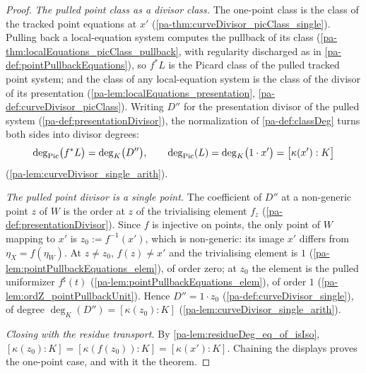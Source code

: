 \begin{proof}
  \emph{The pulled point class as a divisor class.} The one-point class is the class
  of the tracked point equations at \(x'\)
  (\ref{pa-thm:curveDivisor_picClass_single}). Pulling back a local-equation system
  computes the pullback of its class (\ref{pa-thm:localEquations_picClass_pullback}, with
  regularity discharged as in \ref{pa-def:pointPullbackEquations}), so \(f^{*}L\) is the
  Picard class of the pulled tracked point system; and the class of any local-equation
  system is the class of the divisor of its presentation
  (\ref{pa-lem:localEquations_presentation}, \ref{pa-def:curveDivisor_picClass}). Writing
  \(D''\) for the presentation divisor of the pulled system
  (\ref{pa-def:presentationDivisor}), the normalization of \ref{pa-def:classDeg} turns both
  sides into divisor degrees:
  \[
    \deg_{\operatorname{Pic}}\bigl(f^{*}L\bigr) = \deg_{K}\bigl(D''\bigr), \qquad
    \deg_{\operatorname{Pic}}(L) = \deg_{K}\bigl(1 \cdot x'\bigr) = \bigl[\kappa(x') : K\bigr]
  \]
  (\ref{pa-lem:curveDivisor_single_arith}).

  \emph{The pulled point divisor is a single point.} The coefficient of \(D''\) at a
  non-generic point \(z\) of \(W\) is the order at \(z\) of the trivialising element
  \(f_z\) (\ref{pa-def:presentationDivisor}). Since \(f\) is injective on points, the
  only point of \(W\) mapping to \(x'\) is \(z_0 := f^{-1}(x')\), which is
  non-generic: its image \(x'\) differs from \(\eta_X = f(\eta_W)\). At \(z \neq
  z_0\), \(f(z) \neq x'\) and the trivialising element is \(1\)
  (\ref{pa-lem:pointPullbackEquations_elem}), of order zero; at \(z_0\) the element is
  the pulled uniformizer \(f^{\sharp}(t)\) (\ref{pa-lem:pointPullbackEquations_elem}), of
  order \(1\) (\ref{pa-lem:ordZ_pointPullbackUnit}). Hence \(D'' = 1 \cdot z_0\)
  (\ref{pa-def:curveDivisor_single}), of degree
  \(\deg_{K}(D'') = [\kappa(z_0) : K]\) (\ref{pa-lem:curveDivisor_single_arith}).

  \emph{Closing with the residue transport.} By
  \ref{pa-lem:residueDeg_eq_of_isIso},
  \([\kappa(z_0) : K] = [\kappa(f(z_0)) : K] = [\kappa(x') : K]\). Chaining the
  displays proves the one-point case, and with it the theorem.
\end{proof}

